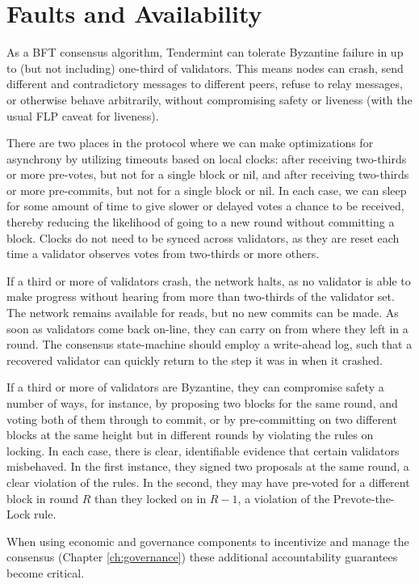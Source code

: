 \section{Faults and Availability}

As a BFT consensus algorithm, Tendermint can tolerate Byzantine failure in up to (but not including) one-third of validators.
This means nodes can crash, send different and contradictory messages to different peers, refuse to relay messages, or otherwise behave arbitrarily,
without compromising safety or liveness (with the usual FLP caveat for liveness).

There are two places in the protocol where we can make optimizations for asynchrony by utilizing timeouts based on local clocks:
after receiving two-thirds or more pre-votes, but not for a single block or nil, and after receiving two-thirds or more pre-commits, 
but not for a single block or nil.
In each case, we can sleep for some amount of time to give slower or delayed votes a chance to be received,
thereby reducing the likelihood of going to a new round without committing a block.
Clocks do not need to be synced across validators, as they are reset each time a validator observes votes from two-thirds or more others.

If a third or more of validators crash, the network halts, 
as no validator is able to make progress without hearing from more than two-thirds of the validator set.
The network remains available for reads, but no new commits can be made.
As soon as validators come back on-line, they can carry on from where they left in a round. 
The consensus state-machine should employ a write-ahead log,
such that a recovered validator can quickly return to the step it was in when it crashed.

If a third or more of validators are Byzantine, they can compromise safety a number of ways, 
for instance, by proposing two blocks for the same round, and voting both of them through to commit, 
or by pre-committing on two different blocks at the same height but in different rounds by violating the rules on locking.
In each case, there is clear, identifiable evidence that certain validators misbehaved. 
In the first instance, they signed two proposals at the same round, a clear violation of the rules.
In the second, they may have pre-voted for a different block in round $R$ than they locked on in $R-1$, 
a violation of the Prevote-the-Lock rule.

When using economic and governance components to incentivize and manage the consensus (Chapter  \ref{ch:governance})
these additional accountability guarantees become critical.

